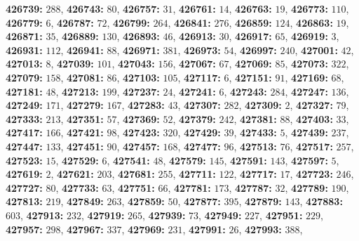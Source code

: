 \textsf{\bfseries 426739:} $288$, \textsf{\bfseries 426743:} $80$, \textsf{\bfseries 426757:} $31$, \textsf{\bfseries 426761:} $14$, \textsf{\bfseries 426763:} $19$, \textsf{\bfseries 426773:} $110$, \textsf{\bfseries 426779:} $6$, \textsf{\bfseries 426787:} $72$, \textsf{\bfseries 426799:} $264$, \textsf{\bfseries 426841:} $276$, \textsf{\bfseries 426859:} $124$, \textsf{\bfseries 426863:} $19$, \textsf{\bfseries 426871:} $35$, \textsf{\bfseries 426889:} $130$, \textsf{\bfseries 426893:} $46$, \textsf{\bfseries 426913:} $30$, \textsf{\bfseries 426917:} $65$, \textsf{\bfseries 426919:} $3$, \textsf{\bfseries 426931:} $112$, \textsf{\bfseries 426941:} $88$, \textsf{\bfseries 426971:} $381$, \textsf{\bfseries 426973:} $54$, \textsf{\bfseries 426997:} $240$, \textsf{\bfseries 427001:} $42$, \textsf{\bfseries 427013:} $8$, \textsf{\bfseries 427039:} $101$, \textsf{\bfseries 427043:} $156$, \textsf{\bfseries 427067:} $67$, \textsf{\bfseries 427069:} $85$, \textsf{\bfseries 427073:} $322$, \textsf{\bfseries 427079:} $158$, \textsf{\bfseries 427081:} $86$, \textsf{\bfseries 427103:} $105$, \textsf{\bfseries 427117:} $6$, \textsf{\bfseries 427151:} $91$, \textsf{\bfseries 427169:} $68$, \textsf{\bfseries 427181:} $48$, \textsf{\bfseries 427213:} $199$, \textsf{\bfseries 427237:} $24$, \textsf{\bfseries 427241:} $6$, \textsf{\bfseries 427243:} $284$, \textsf{\bfseries 427247:} $136$, \textsf{\bfseries 427249:} $171$, \textsf{\bfseries 427279:} $167$, \textsf{\bfseries 427283:} $43$, \textsf{\bfseries 427307:} $282$, \textsf{\bfseries 427309:} $2$, \textsf{\bfseries 427327:} $79$, \textsf{\bfseries 427333:} $213$, \textsf{\bfseries 427351:} $57$, \textsf{\bfseries 427369:} $52$, \textsf{\bfseries 427379:} $242$, \textsf{\bfseries 427381:} $88$, \textsf{\bfseries 427403:} $33$, \textsf{\bfseries 427417:} $166$, \textsf{\bfseries 427421:} $98$, \textsf{\bfseries 427423:} $320$, \textsf{\bfseries 427429:} $39$, \textsf{\bfseries 427433:} $5$, \textsf{\bfseries 427439:} $237$, \textsf{\bfseries 427447:} $133$, \textsf{\bfseries 427451:} $90$, \textsf{\bfseries 427457:} $168$, \textsf{\bfseries 427477:} $96$, \textsf{\bfseries 427513:} $76$, \textsf{\bfseries 427517:} $257$, \textsf{\bfseries 427523:} $15$, \textsf{\bfseries 427529:} $6$, \textsf{\bfseries 427541:} $48$, \textsf{\bfseries 427579:} $145$, \textsf{\bfseries 427591:} $143$, \textsf{\bfseries 427597:} $5$, \textsf{\bfseries 427619:} $2$, \textsf{\bfseries 427621:} $203$, \textsf{\bfseries 427681:} $255$, \textsf{\bfseries 427711:} $122$, \textsf{\bfseries 427717:} $17$, \textsf{\bfseries 427723:} $246$, \textsf{\bfseries 427727:} $80$, \textsf{\bfseries 427733:} $63$, \textsf{\bfseries 427751:} $66$, \textsf{\bfseries 427781:} $173$, \textsf{\bfseries 427787:} $32$, \textsf{\bfseries 427789:} $190$, \textsf{\bfseries 427813:} $219$, \textsf{\bfseries 427849:} $263$, \textsf{\bfseries 427859:} $50$, \textsf{\bfseries 427877:} $395$, \textsf{\bfseries 427879:} $143$, \textsf{\bfseries 427883:} $603$, \textsf{\bfseries 427913:} $232$, \textsf{\bfseries 427919:} $265$, \textsf{\bfseries 427939:} $73$, \textsf{\bfseries 427949:} $227$, \textsf{\bfseries 427951:} $229$, \textsf{\bfseries 427957:} $298$, \textsf{\bfseries 427967:} $337$, \textsf{\bfseries 427969:} $231$, \textsf{\bfseries 427991:} $26$, \textsf{\bfseries 427993:} $388$, 
